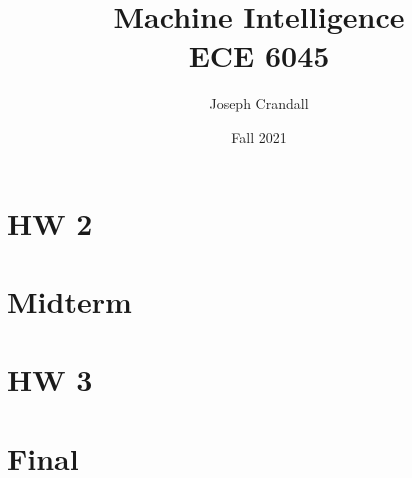 
\usepackage{algorithm, algpseudocode, color, gensymb, siunitx, soul, subfiles}
\usepackage[a4paper, total={7.5in, 10in}]{geometry}

\title{Machine Intelligence\\
\large ECE 6045}
\author{Joseph Crandall}
\date{Fall 2021}


\maketitle

\section{HW 2}


\section{Midterm}


\section{HW 3}


\section{Final}



